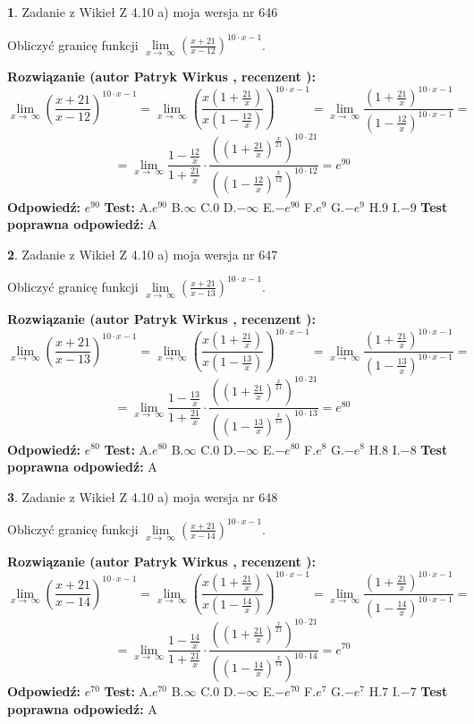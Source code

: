 \documentclass[12pt, a4paper]{article}
\theoremstyle{definition} %
\newtheorem{zad}{}
\newcommand{\zadStart}[1]{\begin{zad}#1\newline}
\newcommand{\zadStop}{\end{zad}}
\newcommand{\rozwStart}[2]{\noindent \textbf{Rozwiązanie (autor #1 , recenzent #2): }\newline}
\newcommand{\rozwStop}{\newline}
\newcommand{\odpStart}{\noindent \textbf{Odpowiedź:}\newline}
\newcommand{\odpStop}{\newline}
\newcommand{\testStart}{\noindent \textbf{Test:}\newline}
\newcommand{\testStop}{\newline}
\newcommand{\kluczStart}{\noindent \textbf{Test poprawna odpowiedź:}\newline}
\newcommand{\kluczStop}{\newline}
\begin{document}
\zadStart{Zadanie z Wikieł Z 4.10 a) moja wersja nr 646}

Obliczyć granicę funkcji  $\lim\limits_{x\to\ \infty}(\frac{x+21}{x-12})^{10\cdot x-1}$.
\zadStop
\rozwStart{Patryk Wirkus}{}
$$\lim\limits_{x\to\ \infty}(\frac{x+21}{x-12})^{10\cdot x-1} = \lim\limits_{x\to\ \infty}(\frac{x(1+\frac{21}{x})}{x(1-\frac{12}{x})})^{10\cdot x-1}=\lim\limits_{x\to\ \infty}\frac{(1+\frac{21}{x})^{10\cdot x-1}}{(1-\frac{12}{x})^{10\cdot x-1}}=$$
$$=\lim\limits_{x\to\ \infty}\frac{1-\frac{12}{x}}{1+\frac{21}{x}}\cdot\frac{((1+\frac{21}{x})^{\frac{x}{21}})^{10\cdot21}}{((1-\frac{12}{x})^{\frac{x}{12}})^{10\cdot12}}=e^{90}$$
\rozwStop
\odpStart
$e^{90}$
\odpStop
\testStart
A.$e^{90}$ B.$\infty$ C.$0$ D.$-\infty$ E.$-e^{90}$
F.$e^{9}$ G.$-e^{9}$
H.$9$
I.$-9$
\testStop
\kluczStart
A
\kluczStop



\zadStart{Zadanie z Wikieł Z 4.10 a) moja wersja nr 647}

Obliczyć granicę funkcji  $\lim\limits_{x\to\ \infty}(\frac{x+21}{x-13})^{10\cdot x-1}$.
\zadStop
\rozwStart{Patryk Wirkus}{}
$$\lim\limits_{x\to\ \infty}(\frac{x+21}{x-13})^{10\cdot x-1} = \lim\limits_{x\to\ \infty}(\frac{x(1+\frac{21}{x})}{x(1-\frac{13}{x})})^{10\cdot x-1}=\lim\limits_{x\to\ \infty}\frac{(1+\frac{21}{x})^{10\cdot x-1}}{(1-\frac{13}{x})^{10\cdot x-1}}=$$
$$=\lim\limits_{x\to\ \infty}\frac{1-\frac{13}{x}}{1+\frac{21}{x}}\cdot\frac{((1+\frac{21}{x})^{\frac{x}{21}})^{10\cdot21}}{((1-\frac{13}{x})^{\frac{x}{13}})^{10\cdot13}}=e^{80}$$
\rozwStop
\odpStart
$e^{80}$
\odpStop
\testStart
A.$e^{80}$ B.$\infty$ C.$0$ D.$-\infty$ E.$-e^{80}$
F.$e^{8}$ G.$-e^{8}$
H.$8$
I.$-8$
\testStop
\kluczStart
A
\kluczStop



\zadStart{Zadanie z Wikieł Z 4.10 a) moja wersja nr 648}

Obliczyć granicę funkcji  $\lim\limits_{x\to\ \infty}(\frac{x+21}{x-14})^{10\cdot x-1}$.
\zadStop
\rozwStart{Patryk Wirkus}{}
$$\lim\limits_{x\to\ \infty}(\frac{x+21}{x-14})^{10\cdot x-1} = \lim\limits_{x\to\ \infty}(\frac{x(1+\frac{21}{x})}{x(1-\frac{14}{x})})^{10\cdot x-1}=\lim\limits_{x\to\ \infty}\frac{(1+\frac{21}{x})^{10\cdot x-1}}{(1-\frac{14}{x})^{10\cdot x-1}}=$$
$$=\lim\limits_{x\to\ \infty}\frac{1-\frac{14}{x}}{1+\frac{21}{x}}\cdot\frac{((1+\frac{21}{x})^{\frac{x}{21}})^{10\cdot21}}{((1-\frac{14}{x})^{\frac{x}{14}})^{10\cdot14}}=e^{70}$$
\rozwStop
\odpStart
$e^{70}$
\odpStop
\testStart
A.$e^{70}$ B.$\infty$ C.$0$ D.$-\infty$ E.$-e^{70}$
F.$e^{7}$ G.$-e^{7}$
H.$7$
I.$-7$
\testStop
\kluczStart
A
\kluczStop
\end{document}

